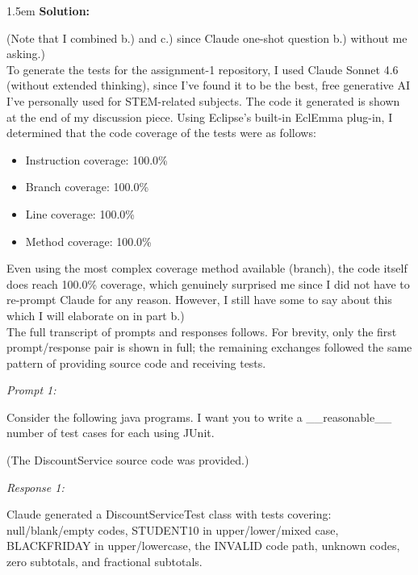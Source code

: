 \documentclass[10pt]{article}
\newcounter{question}
\newenvironment{solution}{
	\vspace{.5em}
	\par
	\begin{adjustwidth}{1.5em}{}
	\textbf{{Solution:}}
	\par
	\vspace{.5em}
}{
	\vspace{1em}
	\end{adjustwidth}
}
\newenvironment{transcript}[1]{
	\vspace{.5em}
	\par
	\noindent
	\emph{#1:}
	\par
	\vspace{.5em}
}{
	\vspace{.5em}
}
\begin{document}
\begin{solution}
	(Note that I combined b.) and c.) since Claude one-shot question b.) without me asking.) \\

	To generate the tests for the assignment-1 repository, I used Claude Sonnet 4.6 (without extended thinking), since I've found it to be the best, free generative AI I've personally used for STEM-related subjects. The code it generated is shown at the end of my discussion piece. Using Eclipse's built-in EclEmma plug-in, I determined that the code coverage of the tests were as follows: \\
	\begin{itemize}
		\item Instruction coverage: 100.0\%
		\item Branch coverage: 100.0\%
		\item Line coverage: 100.0\%
		\item Method coverage: 100.0\% \\
	\end{itemize}

	Even using the most complex coverage method available (branch), the code itself does reach 100.0\% coverage, which genuinely surprised me since I did not have to re-prompt Claude for any reason. However, I still have some to say about this which I will elaborate on in part b.) \\

	The full transcript of prompts and responses follows. For brevity, only the first prompt/response pair is shown in full; the remaining exchanges followed the same pattern of providing source code and receiving tests. \\

	\begin{transcript}{Prompt 1}
		Consider the following java programs. I want you to write a \_\_reasonable\_\_ number of test cases for each using JUnit.
	\end{transcript}

	(The DiscountService source code was provided.) \\

	\begin{transcript}{Response 1}
		Claude generated a DiscountServiceTest class with tests covering: null/blank/empty codes, STUDENT10 in upper/lower/mixed case, BLACKFRIDAY in upper/lowercase, the INVALID code path, unknown codes, zero subtotals, and fractional subtotals.
	\end{transcript}


\end{solution}
\end{document}

